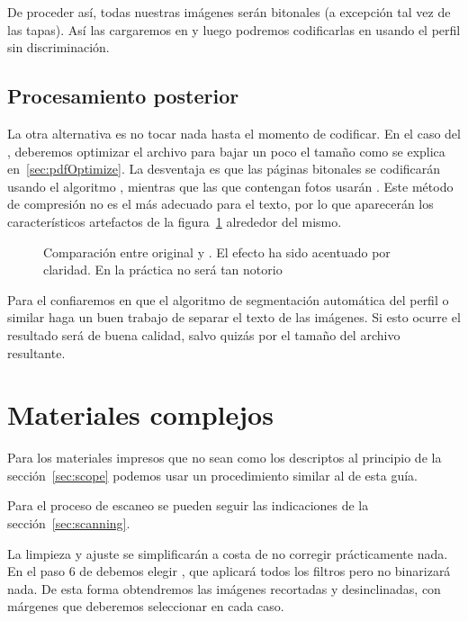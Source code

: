 \documentclass[%
	a5paper,
	10pt,
	twoside,
	openright,
	final,
]{memoir}
\begin{document}
	De proceder así, todas nuestras imágenes serán bitonales (a excepción tal vez de las tapas). Así las cargaremos en \abby y luego podremos codificarlas en \djvu usando el perfil  sin discriminación.

	\section{Procesamiento posterior} La otra alternativa es no tocar nada hasta el momento de codificar. En el caso del \pdf, deberemos optimizar el archivo para bajar un poco el tamaño como se explica en~\ref{sec:pdfOptimize}. La desventaja es que las páginas bitonales se codificarán usando el algoritmo \jbig, mientras que las que contengan fotos usarán \jpeg. Este método de compresión no es el más adecuado para el texto, por lo que aparecerán los característicos artefactos de la figura~\ref{fig:SToutputPictureZonesJpeg} alrededor del mismo.

	\begin{figure}
		\caption[Comparación entre original y \jpeg]{Comparación entre original y \jpeg. El efecto ha sido acentuado por claridad. En la práctica no será tan notorio\label{fig:SToutputPictureZonesJpeg}}
	\end{figure}

	Para el \djvu confiaremos en que el algoritmo de segmentación automática del perfil  o similar haga un buen trabajo de separar el texto de las imágenes. Si esto ocurre el resultado será de buena calidad, salvo quizás por el tamaño del archivo resultante.

	\chapter{Materiales complejos\label{sec:complexScans}} Para los materiales impresos que no sean como los descriptos al principio de la sección~\ref{sec:scope} podemos usar un procedimiento similar al de esta guía.

	Para el proceso de escaneo se pueden seguir las indicaciones de la sección~\ref{sec:scanning}.

	La limpieza y ajuste se simplificarán a costa de no corregir prácticamente nada. En el paso 6 de \scantailor debemos elegir , que aplicará todos los filtros pero no binarizará nada. De esta forma obtendremos las imágenes recortadas y desinclinadas, con márgenes que deberemos seleccionar en cada caso.
\end{document}
